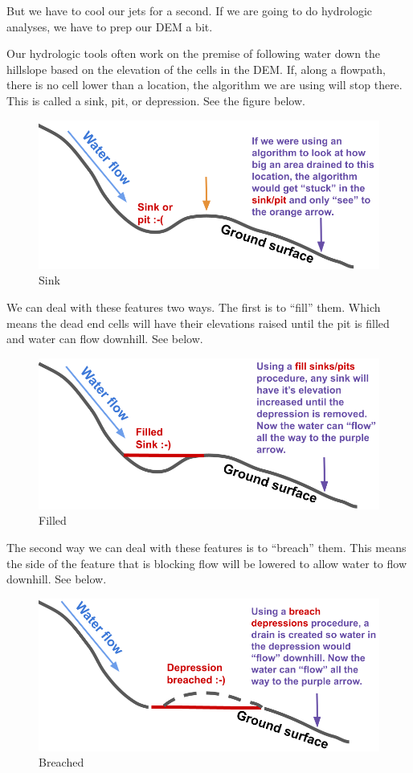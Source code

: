 \documentclass[
]{book}
\begin{document}
But we have to cool our jets for a second. If we are going to do hydrologic analyses, we have to prep our DEM a bit.

Our hydrologic tools often work on the premise of following water down the hillslope based on the elevation of the cells in the DEM. If, along a flowpath, there is no cell lower than a location, the algorithm we are using will stop there. This is called a sink, pit, or depression. See the figure below.

\begin{figure}
\centering
\includegraphics{images/sink.png}
\caption{Sink}
\end{figure}

We can deal with these features two ways. The first is to ``fill'' them. Which means the dead end cells will have their elevations raised until the pit is filled and water can flow downhill. See below.

\begin{figure}
\centering
\includegraphics{images/filled.png}
\caption{Filled}
\end{figure}

The second way we can deal with these features is to ``breach'' them. This means the side of the feature that is blocking flow will be lowered to allow water to flow downhill. See below.

\begin{figure}
\centering
\includegraphics{images/breached.png}
\caption{Breached}
\end{figure}
\end{document}
